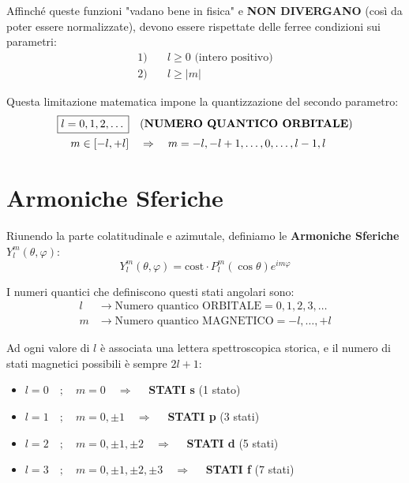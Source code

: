 \documentclass[11pt, a4paper]{article}
\begin{document}
\noindent
Affinché queste funzioni "vadano bene in fisica" e \textbf{NON DIVERGANO} (così da poter essere normalizzate), devono essere rispettate delle ferree condizioni sui parametri: %
\begin{align*}
    1) \quad & l \ge 0 \text{ (intero positivo)} \\ %
    2) \quad & l \ge |m| %
\end{align*}

Questa limitazione matematica impone la quantizzazione del secondo parametro: %
\begin{align}
    \boxed{ l = 0, 1, 2, \dots } \quad &\text{(\textbf{NUMERO QUANTICO ORBITALE})} \label{eq:orb} \\ %
    m \in [-l, +l] \quad &\Rightarrow \quad m = -l, -l+1, \dots , 0, \dots , l-1, l \label{eq:mag} %
\end{align}

\section{Armoniche Sferiche} %

Riunendo la parte colatitudinale e azimutale, definiamo le \textbf{Armoniche Sferiche} $Y_l^m(\theta, \varphi)$: %
\begin{equation}
    \boxed{ Y_l^m(\theta, \varphi) = \text{cost} \cdot P_l^m(\cos\theta) e^{im\varphi} } %
\end{equation}

I numeri quantici che definiscono questi stati angolari sono: %
\begin{align*}
    l &\to \text{Numero quantico ORBITALE} = 0, 1, 2, 3, \dots \\ %
    m &\to \text{Numero quantico MAGNETICO} = -l, \dots, +l %
\end{align*}

\noindent
Ad ogni valore di $l$ è associata una lettera spettroscopica storica, e il numero di stati magnetici possibili è sempre $2l + 1$: %
\begin{itemize}
    \item $l = 0 \quad ; \quad m = 0 \quad \Rightarrow \quad$ \textbf{STATI s} (1 stato) %
    \item $l = 1 \quad ; \quad m = 0, \pm 1 \quad \Rightarrow \quad$ \textbf{STATI p} (3 stati) %
    \item $l = 2 \quad ; \quad m = 0, \pm 1, \pm 2 \quad \Rightarrow \quad$ \textbf{STATI d} (5 stati) %
    \item $l = 3 \quad ; \quad m = 0, \pm 1, \pm 2, \pm 3 \quad \Rightarrow \quad$ \textbf{STATI f} (7 stati) %
\end{itemize}
\end{document}
